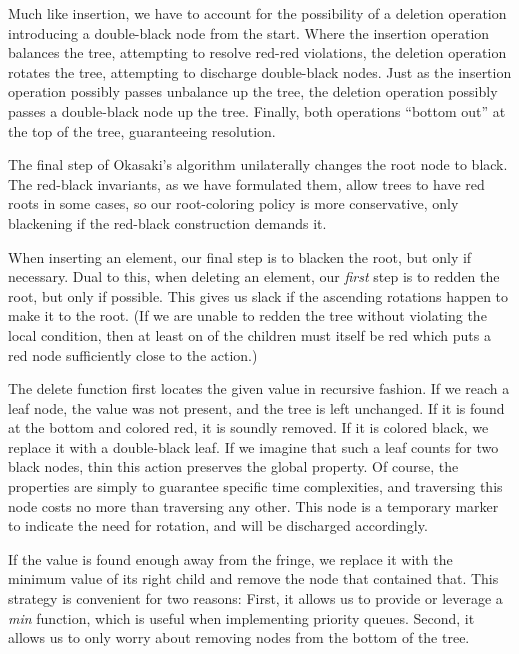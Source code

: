 \documentclass[preprint]{sigplanconf}
\begin{document}

Much like insertion, we have to account for the possibility of a deletion operation introducing a double-black node from the start. Where the insertion operation balances the tree, attempting to resolve red-red violations, the deletion operation rotates the tree, attempting to discharge double-black nodes. Just as the insertion operation possibly passes unbalance up the tree, the deletion operation possibly passes a double-black node up the tree. Finally, both operations ``bottom out'' at the top of the tree, guaranteeing resolution.

The final step of Okasaki's algorithm unilaterally changes the root node to black. The red-black invariants, as we have formulated them, allow trees to have red roots in some cases, so our root-coloring policy is more conservative, only blackening if the red-black construction demands it.

When inserting an element, our final step is to blacken the root, but only if necessary. Dual to this, when deleting an element, our \emph{first} step is to redden the root, but only if possible. This gives us slack if the ascending rotations happen to make it to the root. (If we are unable to redden the tree without violating the local condition, then at least on of the children must itself be red which puts a red node sufficiently close to the action.)

The delete function first locates the given value in recursive fashion. If we reach a leaf node, the value was not present, and the tree is left unchanged. If it is found at the bottom and colored red, it is soundly removed. If it is colored black, we replace it with a double-black leaf. If we imagine that such a leaf counts for two black nodes, thin this action preserves the global property. Of course, the properties are simply to guarantee specific time complexities, and traversing this node costs no more than traversing any other. This node is a temporary marker to indicate the need for rotation, and will be discharged accordingly.

If the value is found enough away from the fringe, we replace it with the minimum value of its right child and remove the node that contained that. This strategy is convenient for two reasons: First, it allows us to provide or leverage a \emph{min} function, which is useful when implementing priority queues. Second, it allows us to only worry about removing nodes from the bottom of the tree.
\end{document}
